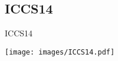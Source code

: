 





\subsection{ICCS14}

\begin{frame}{ICCS14}
	\begin{center}
		\texttt{[image: images/ICCS14.pdf]}
	\end{center}
\end{frame}
